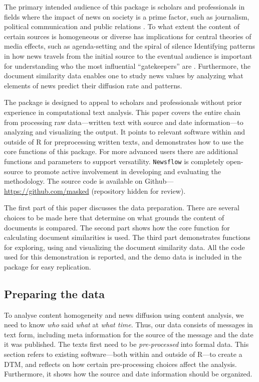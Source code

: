 \documentclass[]{article}
\begin{document}
The primary intended audience of this package is scholars and
professionals in fields where the impact of news on society is a prime
factor, such as journalism, political communication and public relations
\citep{baum08, boczkowski07, ragas14}. To what extent the content of
certain sources is homogeneous or diverse has implications for central
theories of media effects, such as agenda-setting and the spiral of
silence \citep{bennett08, blumler99} Identifying patterns in how news
travels from the initial source to the eventual audience is important
for understanding who the most influential ``gatekeepers'' are
\citep{shoemaker09}. Furthermore, the document similarity data enables
one to study news values \citep{galtung65} by analyzing what elements of
news predict their diffusion rate and patterns.

The package is designed to appeal to scholars and professionals without
prior experience in computational text analysis. This paper covers the
entire chain from processing raw data---written text with source and
date information---to analyzing and visualizing the output. It points to
relevant software within and outside of R for preprocessing written
texts, and demonstrates how to use the core functions of this package.
For more advanced users there are additional functions and parameters to
support versatility. \texttt{Newsflow} is completely open-source to
promote active involvement in developing and evaluating the methodology.
The source code is available on Github---\url{https://github.com/masked}
(repository hidden for review).

The first part of this paper discusses the data preparation. There are
several choices to be made here that determine on what grounds the
content of documents is compared. The second part shows how the core
function for calculating document similarities is used. The third part
demonstrates functions for exploring, using and visualizing the document
similarity data. All the code used for this demonstration is reported,
and the demo data is included in the package for easy replication.

\subsection{Preparing the data}\label{preparing-the-data}

To analyse content homogeneity and news diffusion using content
analysis, we need to know \emph{who} said \emph{what} at \emph{what
time}. Thus, our data consists of messages in text form, including meta
information for the source of the message and the date it was published.
The texts first need to be \emph{pre-processed} into formal data. This
section refers to existing software---both within and outside of R---to
create a DTM, and reflects on how certain pre-processing choices affect
the analysis. Furthermore, it shows how the source and date information
should be organized.
\end{document}
